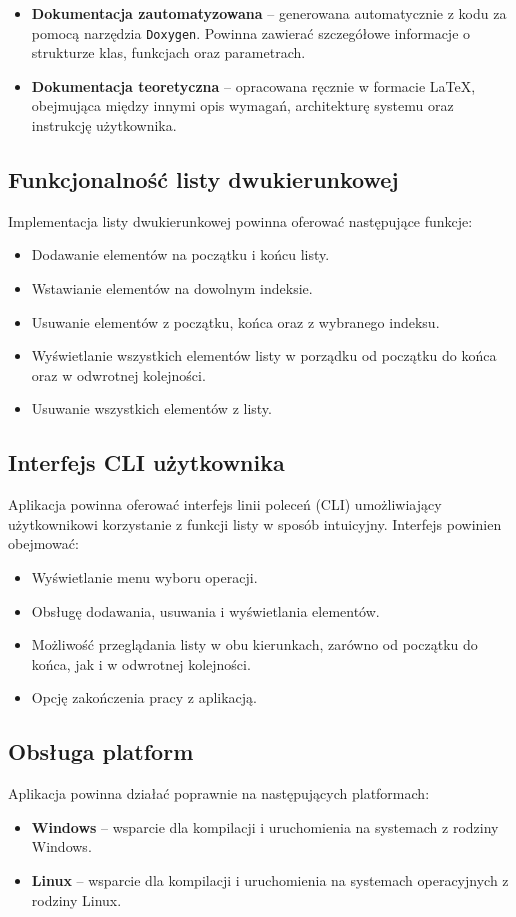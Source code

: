 \begin{itemize}
	\item \textbf{Dokumentacja zautomatyzowana} – generowana automatycznie z kodu za pomocą narzędzia \texttt{Doxygen}. Powinna zawierać szczegółowe informacje o strukturze klas, funkcjach oraz parametrach.
	\item \textbf{Dokumentacja teoretyczna} – opracowana ręcznie w formacie \LaTeX{}, obejmująca między innymi opis wymagań, architekturę systemu oraz instrukcję użytkownika.
\end{itemize}

\subsection{Funkcjonalność listy dwukierunkowej}
Implementacja listy dwukierunkowej powinna oferować następujące funkcje:

\begin{itemize}
	\item Dodawanie elementów na początku i końcu listy.
	\item Wstawianie elementów na dowolnym indeksie.
	\item Usuwanie elementów z początku, końca oraz z wybranego indeksu.
	\item Wyświetlanie wszystkich elementów listy w porządku od początku do końca oraz w odwrotnej kolejności.
	\item Usuwanie wszystkich elementów z listy.
\end{itemize}

\subsection{Interfejs CLI użytkownika}
Aplikacja powinna oferować interfejs linii poleceń (CLI) umożliwiający użytkownikowi korzystanie z funkcji listy w sposób intuicyjny. Interfejs powinien obejmować:

\begin{itemize}
	\item Wyświetlanie menu wyboru operacji.
	\item Obsługę dodawania, usuwania i wyświetlania elementów.
	\item Możliwość przeglądania listy w obu kierunkach, zarówno od początku do końca, jak i w odwrotnej kolejności.
	\item Opcję zakończenia pracy z aplikacją.
\end{itemize}

\subsection{Obsługa platform}
Aplikacja powinna działać poprawnie na następujących platformach:

\begin{itemize}
	\item \textbf{Windows} – wsparcie dla kompilacji i uruchomienia na systemach z rodziny Windows.
	\item \textbf{Linux} – wsparcie dla kompilacji i uruchomienia na systemach operacyjnych z rodziny Linux.
\end{itemize}
